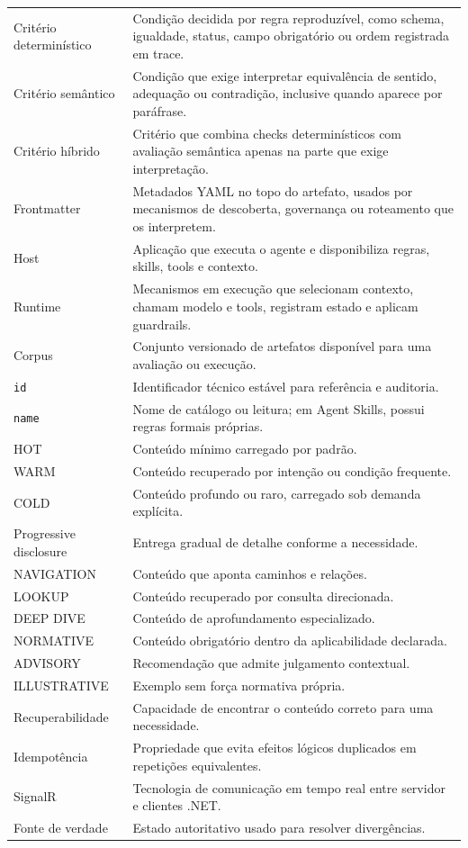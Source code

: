 \documentclass[
  10pt,
  a4paper,
  oneside]{book}
\begin{document}
\begin{longtable}[]{@{}
  >{\raggedright\arraybackslash}p{}
  >{\raggedright\arraybackslash}p{}@{}}
Critério determinístico & Condição decidida por regra reproduzível, como
schema, igualdade, status, campo obrigatório ou ordem registrada em
trace. \\
Critério semântico & Condição que exige interpretar equivalência de
sentido, adequação ou contradição, inclusive quando aparece por
paráfrase. \\
Critério híbrido & Critério que combina checks determinísticos com
avaliação semântica apenas na parte que exige interpretação. \\
Frontmatter & Metadados YAML no topo do artefato, usados por mecanismos
de descoberta, governança ou roteamento que os interpretem. \\
Host & Aplicação que executa o agente e disponibiliza regras, skills,
tools e contexto. \\
Runtime & Mecanismos em execução que selecionam contexto, chamam modelo
e tools, registram estado e aplicam guardrails. \\
Corpus & Conjunto versionado de artefatos disponível para uma avaliação
ou execução. \\
\texttt{id} & Identificador técnico estável para referência e
auditoria. \\
\texttt{name} & Nome de catálogo ou leitura; em Agent Skills, possui
regras formais próprias. \\
HOT & Conteúdo mínimo carregado por padrão. \\
WARM & Conteúdo recuperado por intenção ou condição frequente. \\
COLD & Conteúdo profundo ou raro, carregado sob demanda explícita. \\
Progressive disclosure & Entrega gradual de detalhe conforme a
necessidade. \\
NAVIGATION & Conteúdo que aponta caminhos e relações. \\
LOOKUP & Conteúdo recuperado por consulta direcionada. \\
DEEP DIVE & Conteúdo de aprofundamento especializado. \\
NORMATIVE & Conteúdo obrigatório dentro da aplicabilidade declarada. \\
ADVISORY & Recomendação que admite julgamento contextual. \\
ILLUSTRATIVE & Exemplo sem força normativa própria. \\
Recuperabilidade & Capacidade de encontrar o conteúdo correto para uma
necessidade. \\
Idempotência & Propriedade que evita efeitos lógicos duplicados em
repetições equivalentes. \\
SignalR & Tecnologia de comunicação em tempo real entre servidor e
clientes .NET. \\
Fonte de verdade & Estado autoritativo usado para resolver
divergências. \\
\end{longtable}
\end{document}
